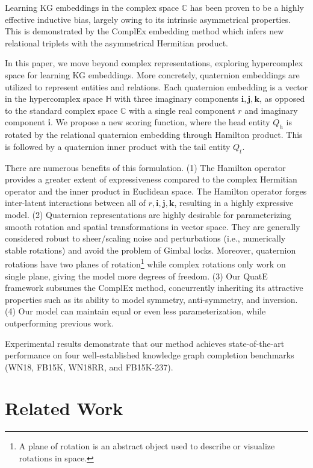 \documentclass{article}
\begin{document}
Learning KG embeddings in the complex space $\mathbb{C}$ has been proven to be a highly effective inductive bias, largely owing to its intrinsic asymmetrical properties. This is demonstrated by the ComplEx embedding method which infers new relational triplets with the asymmetrical Hermitian product.

In this paper, we move beyond complex representations, exploring hypercomplex space for learning KG embeddings. More concretely, quaternion embeddings are utilized to represent entities and relations. Each quaternion embedding is a vector in the hypercomplex space $\mathbb{H}$ with three imaginary components $\textbf{i},\textbf{j},\textbf{k}$, as opposed to the standard complex space $\mathbb{C}$ with a single real component $r$ and imaginary component $\textbf{i}$. We propose a new scoring function, where the head entity $Q_h$ is rotated by the relational quaternion embedding through Hamilton product. This is followed by a quaternion inner product with the tail entity $Q_t$.

There are numerous benefits of this formulation. (1) The Hamilton operator provides a greater extent of expressiveness compared to the complex Hermitian operator and the inner product in Euclidean space. The Hamilton operator forges inter-latent interactions between all of $r,\textbf{i},\textbf{j},\textbf{k}$, resulting in a highly expressive model. (2) Quaternion representations are highly desirable for parameterizing smooth rotation and spatial transformations in vector space. They are generally considered robust to sheer/scaling noise and perturbations (i.e., numerically stable rotations) and avoid the problem of Gimbal locks. Moreover, quaternion rotations have two planes of rotation\footnote{A plane of rotation is an abstract object used to describe or visualize rotations in space.} while complex rotations only work on single plane, giving the model more degrees of freedom. (3) Our QuatE framework subsumes the ComplEx method, concurrently inheriting its attractive properties such as its ability to model symmetry, anti-symmetry, and inversion. (4) Our model can maintain equal or even less parameterization, while outperforming previous work.

Experimental results demonstrate that our method achieves state-of-the-art performance on four well-established knowledge graph completion benchmarks (WN18, FB15K, WN18RR, and FB15K-237).





\section{Related Work}
\end{document}
